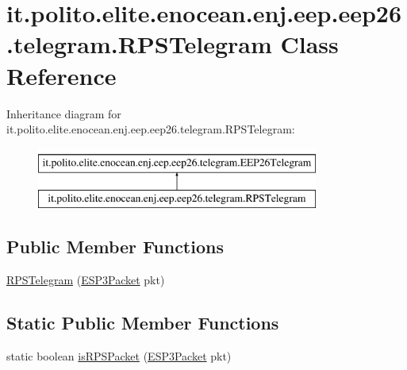 \hypertarget{classit_1_1polito_1_1elite_1_1enocean_1_1enj_1_1eep_1_1eep26_1_1telegram_1_1_r_p_s_telegram}{}\section{it.\+polito.\+elite.\+enocean.\+enj.\+eep.\+eep26.\+telegram.\+R\+P\+S\+Telegram Class Reference}
\label{classit_1_1polito_1_1elite_1_1enocean_1_1enj_1_1eep_1_1eep26_1_1telegram_1_1_r_p_s_telegram}
Inheritance diagram for it.\+polito.\+elite.\+enocean.\+enj.\+eep.\+eep26.\+telegram.\+R\+P\+S\+Telegram\+:\begin{figure}[H]
\begin{center}
\leavevmode
\includegraphics[height=2.000000cm]{classit_1_1polito_1_1elite_1_1enocean_1_1enj_1_1eep_1_1eep26_1_1telegram_1_1_r_p_s_telegram}
\end{center}
\end{figure}
\subsection*{Public Member Functions}
\begin{DoxyCompactItemize}
\item 
\hyperlink{classit_1_1polito_1_1elite_1_1enocean_1_1enj_1_1eep_1_1eep26_1_1telegram_1_1_r_p_s_telegram_addb93b678e78c0bd0cec292cb258df25}{R\+P\+S\+Telegram} (\hyperlink{classit_1_1polito_1_1elite_1_1enocean_1_1protocol_1_1serial_1_1v3_1_1network_1_1packet_1_1_e_s_p3_packet}{E\+S\+P3\+Packet} pkt)
\end{DoxyCompactItemize}
\subsection*{Static Public Member Functions}
\begin{DoxyCompactItemize}
\item 
static boolean \hyperlink{classit_1_1polito_1_1elite_1_1enocean_1_1enj_1_1eep_1_1eep26_1_1telegram_1_1_r_p_s_telegram_a6ed007a381dae3304bef7f3ead8e022f}{is\+R\+P\+S\+Packet} (\hyperlink{classit_1_1polito_1_1elite_1_1enocean_1_1protocol_1_1serial_1_1v3_1_1network_1_1packet_1_1_e_s_p3_packet}{E\+S\+P3\+Packet} pkt)
\end{DoxyCompactItemize}
